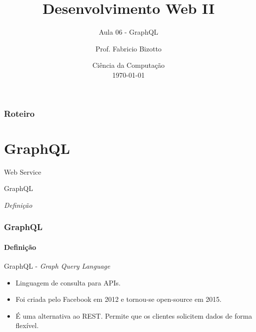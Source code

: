 \documentclass[
	9pt, %
	t, %
]{beamer}
\title[DesWebII]{Desenvolvimento Web II} %
\subtitle{Aula 06 - GraphQL} %
\author[Fabricio Bizotto]{Prof. Fabricio Bizotto} %
\institute[IFC]{Instituto Federal Catarinense \\ \smallskip \textit{fabricio.bizotto@ifc.edu.br}} %
\date[\today]{Ciência da Computação \\ \today} %
\begin{document}

\begin{frame}
	\titlepage %
\end{frame}


\begin{frame}
	\frametitle{Roteiro} %

	\tableofcontents %
\end{frame}


\section{GraphQL}

\begin{frame}
	\begin{center}

		\bigskip\bigskip\bigskip\bigskip %
		{\Large Web Service}

		\bigskip\bigskip %
		{\Huge GraphQL}

		\smallskip
		{\small \textit{Definição}}
	\end{center}

\end{frame}

\begin{frame}
	\frametitle{GraphQL}
	\framesubtitle{Definição}

	\begin{block}{GraphQL - \textit{Graph Query Language}}
		\begin{itemize}
			\item Linguagem de consulta para APIs.
			\item Foi criada pelo Facebook em 2012 e tornou-se open-source em 2015.
			\item É uma alternativa ao REST. Permite que os clientes solicitem dados de forma flexível.
		\end{itemize}
	\end{block}

\end{frame}
\end{document}
